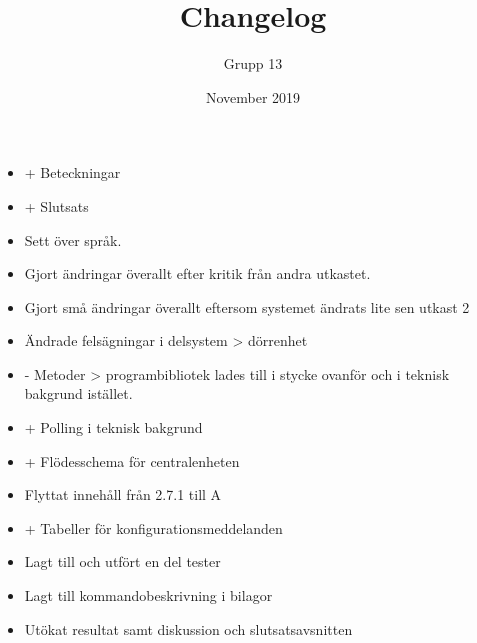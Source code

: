 \documentclass{article}
\title{Changelog}
\author{Grupp 13}
\date{November 2019}
\begin{document}
\maketitle
\begin{itemize}
    \item + Beteckningar
    \item + Slutsats
    \item Sett över språk.
    \item Gjort ändringar överallt efter kritik från andra utkastet. 
    \item Gjort små ändringar överallt eftersom systemet ändrats lite sen utkast 2
    \item Ändrade felsägningar i delsystem > dörrenhet
    \item - Metoder > programbibliotek lades till i stycke ovanför och i teknisk bakgrund istället.
    \item + Polling i teknisk bakgrund
    \item + Flödesschema för centralenheten
    \item Flyttat innehåll från 2.7.1 till A
    \item + Tabeller för konfigurationsmeddelanden
    \item Lagt till och utfört en del tester
    \item Lagt till kommandobeskrivning i bilagor
    \item Utökat resultat samt diskussion och slutsatsavsnitten
\end{itemize}
\end{document}
